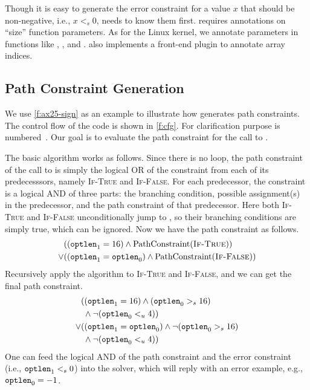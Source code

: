 Though it is easy to generate the error constraint for a value $x$
that should be non-negative, i.e., $x <_s 0$, \sys needs to know
them first.  \sys requires annotations on ``size'' function parameters.
As for the Linux kernel, we annotate parameters in functions like
, , and .
\sys also implements a front-end plugin to annotate array indices.

\subsection{Path Constraint Generation}

We use \autoref{f:ax25-sign} as an example to illustrate how \sys
generates path constraints.  The control flow of the code is shown
in \autoref{f:cfg}.  For clarification purpose  is
numbered~\cite[\chapterautorefname~8.11]{whale}.  Our goal is to
evaluate the path constraint for the call to .

The basic algorithm works as follows.  Since there is no loop, the
path constraint of the call to  is simply the
logical OR of the constraint from each of its predecesssors, namely
\textsc{If-True} and \textsc{If-False}.  For each predecessor, the
constraint is a logical AND of three parts: the branching condition,
possible assignment(s) in the predecessor, and the path constraint
of that predecessor.  Here both \textsc{If-True} and \textsc{If-False}
unconditionally jump to , so their branching
conditions are simply true, which can be ignored.  Now we have the
path constraint as follows.
\begin{align*}
& ((\texttt{optlen}_1 = 16) \land \operatorname{PathConstraint}(\textsc{If-True})) \\
\lor & ((\texttt{optlen}_1 = \texttt{optlen}_0) \land \operatorname{PathConstraint}(\textsc{If-False}))
\end{align*}
Recursively apply the algorithm to \textsc{If-True} and \textsc{If-False},
and we can get the final path constraint.
\begin{align*}
& ((\texttt{optlen}_1 = 16) \land (\texttt{optlen}_0 >_s 16) \\
& \; \land \neg(\texttt{optlen}_0 <_u 4)) \\
\lor & ((\texttt{optlen}_1 = \texttt{optlen}_0) \land \neg(\texttt{optlen}_0 >_s 16) \\
     & \; \land \neg(\texttt{optlen}_0 <_u 4))
\end{align*}
One can feed the logical AND of the path constraint and the error
constraint (i.e., $\texttt{optlen}_1 <_s 0$) into the solver, which
will reply with an error example, e.g., $\texttt{optlen}_0 = -1$.

